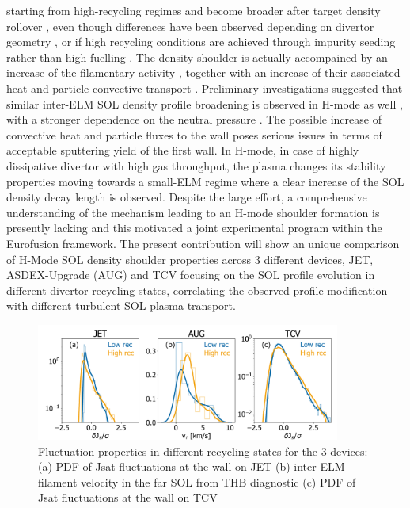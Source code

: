 \documentclass[12pt, a4paper, twoside]{article}
\begin{document}
starting from high-recycling regimes and become broader after target
density rollover \cite{vianello:nf2019}, even
though differences have been observed depending on divertor geometry
\cite{Wynn:2018gp}, or if high recycling conditions are achieved
through impurity seeding rather than high fuelling
\cite{Wynn:2018gp,Kuang:2019248}.
The density shoulder is actually accompained by
an increase of the filamentary activity
\cite{Carralero:2017gb,vianello:nf2019,Kuang:2019248}, together with an increase of
their associated heat and particle convective transport \cite{Carralero:2017gb}.
Preliminary investigations suggested that similar inter-ELM SOL
density profile broadening is observed in H-mode as well
\cite{Muller:2015jt,Carralero:2017gb,vianello:nf2019}, with a stronger
dependence on the neutral pressure \cite{vianello:nf2019}. The
possible increase of convective heat and particle fluxes to the wall
poses serious issues in terms of acceptable sputtering yield of the
first wall. In H-mode,
in case of highly dissipative divertor with high gas throughput, the
plasma changes its stability properties moving towards a small-ELM
regime \cite{Harrer:2018jn} where a clear increase of
the SOL density decay length is observed.
Despite the
large effort, a comprehensive understanding
of the mechanism leading to an H-mode shoulder formation is presently
lacking and this motivated a joint experimental program within the
Eurofusion framework.
The present contribution will show an unique comparison of H-Mode SOL
density shoulder properties across 3 different devices, JET, ASDEX-Upgrade (AUG) and
TCV focusing on the SOL profile evolution in different divertor recycling
states, correlating the observed profile modification with different turbulent SOL
plasma transport.
\begin{figure}
\includegraphics[width=100mm]{../pdfbox/SynopsisFluctuationCombined.pdf}
\caption{Fluctuation properties in different recycling states for the
  3 devices:(a) PDF of Jsat fluctuations at the wall on JET (b)
  inter-ELM filament velocity in the far SOL from THB diagnostic (c) PDF of Jsat fluctuations at the wall on TCV}
\vspace{-2.6ex}
\label{fig:figFluctuations}
\end{figure}
\end{document}
